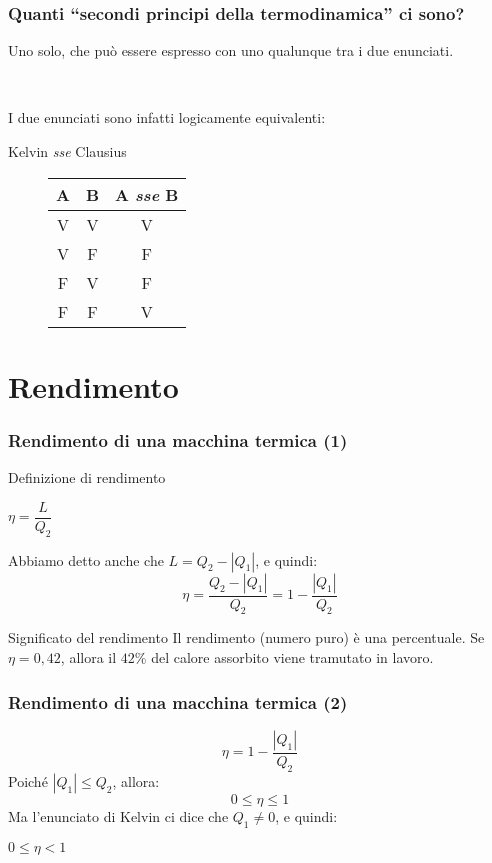 \documentclass[]{beamer}
\theoremstyle{plain}
\begin{document}
\begin{frame}
  \frametitle{Quanti ``secondi principi della termodinamica'' ci sono?}
  \pause
  \alert<2>{Uno solo}, che può essere espresso con uno qualunque tra i due enunciati.
  \pause
  
  ~

  I due enunciati sono infatti \alert{logicamente equivalenti}:
  \begin{center}
  Kelvin \emph{sse} Clausius
  \end{center}
  \begin{figure}\centering
  \begin{tabular}{|c|c|c|}\hline
     A&B&A \emph{sse} B\\\hline
     V&V&V \\\hline
     V&F&F \\\hline
     F&V&F \\\hline
     F&F&V \\\hline
  \end{tabular}
  \end{figure}
  
\end{frame}



\section{Rendimento}

\begin{frame}
  \frametitle{Rendimento di una macchina termica (1)}
  \begin{block}{Definizione di rendimento}
    \begin{center}
      \colorbox{blue!30}{$ \eta = \dfrac{L}{Q_2} $}
    \end{center}\pause
Abbiamo detto anche che $ L = Q_2 - |Q_1| $, e quindi:
\[ \eta = \frac{Q_2 - |Q_1|}{Q_2} = 1 - \frac{|Q_1|}{Q_2} \]\pause
\end{block}

\begin{alertblock}{Significato del rendimento}
  Il rendimento (numero puro) è una percentuale. Se $ \eta = 0,42 $, allora il $ 42\% $ del calore assorbito viene tramutato in lavoro.
\end{alertblock}
\end{frame}



\begin{frame}
  \frametitle{Rendimento di una macchina termica (2)}
  \[ \eta = 1 - \frac{|Q_1|}{Q_2} \]
Poiché $ |Q_1|\leq Q_2 $, allora:\[ 0 \leq \eta \leq 1 \]\pause
Ma l'enunciato di Kelvin ci dice che $ Q_1 \neq 0 $, e quindi:
\begin{center}
\colorbox{blue!30}{$ 0 \leq \eta < 1 $}
\end{center}
\end{frame}
\end{document}
